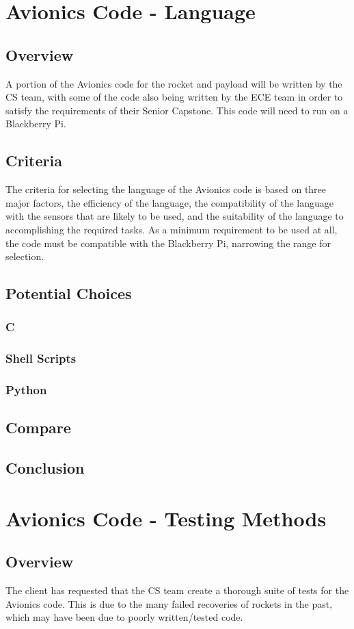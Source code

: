\documentclass[onecolumn, draftclsnofoot,10pt, compsoc]{IEEEtran}
\begin{document}
\section{Avionics Code - Language}
\subsection{Overview}
A portion of the Avionics code for the rocket and payload will be written by the CS team, with some of the code also being written by the ECE team in order to satisfy the requirements of their Senior Capstone. This code will need to run on a Blackberry Pi.
\subsection{Criteria}
The criteria for selecting the language of the Avionics code is based on three major factors, the efficiency of the language, the compatibility of the language with the sensors that are likely to be used, and the suitability of the language to accomplishing the required tasks. As a minimum requirement to be used at all, the code must be compatible with the Blackberry Pi, narrowing the range for selection.
\subsection{Potential Choices}
\subsubsection{C}
\subsubsection{Shell Scripts}
\subsubsection{Python}
\subsection{Compare}
\subsection{Conclusion}

\section{Avionics Code - Testing Methods}
\subsection{Overview}
The client has requested that the CS team create a thorough suite of tests for the Avionics code. This is due to the many failed recoveries of rockets in the past, which may have been due to poorly written/tested code.
\end{document}
